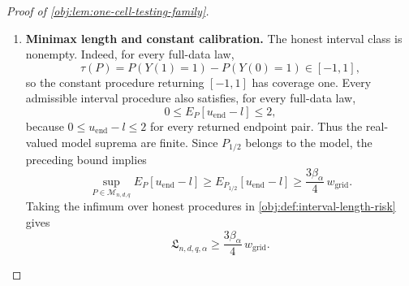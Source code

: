 \begin{proof}[Proof of \cref{obj:lem:one-cell-testing-family}]
\begin{enumerate}
Summing coverage probabilities under the reference output law gives
\[
\int C_{\mathrm{grid}}(l,u_{\mathrm{end}})\,
     \mu_{\mathrm{ref}}(d(l,u_{\mathrm{end}}))
=
\sum_{j=0}^{M}\mu_{\mathrm{ref}}(B_j)
\ge(M+1)(\beta_\alpha-\varepsilon_\alpha).
\]
Integrating the pointwise length bound therefore yields
\[
\int(u_{\mathrm{end}}-l)\,\mu_{\mathrm{ref}}(d(l,u_{\mathrm{end}}))
\ge
\Delta_{\mathrm{grid}}
\left((M+1)\frac{7\beta_\alpha}{8}-1\right).
\]
The choice of \(M\) gives \(M\beta_\alpha\ge8\), and
\[
(M+1)\frac{7\beta_\alpha}{8}-1
-\frac{3\beta_\alpha M}{4}
=
\frac{M\beta_\alpha}{8}
+\frac{7\beta_\alpha}{8}-1
\ge0.
\]
Since \(M\Delta_{\mathrm{grid}}=w_{\mathrm{grid}}\), we conclude
\[
\int(u_{\mathrm{end}}-l)\,\mu_{\mathrm{ref}}(d(l,u_{\mathrm{end}}))
\ge\frac{3\beta_\alpha}{4}\,w_{\mathrm{grid}}.
\]
The endpoint length is measurable and bounded by two. Integrating first over the sample and then over the kernel therefore equals integration under its output law, giving
\[
E_{P_{1/2}}[u_{\mathrm{end}}-l]
=
\int(u_{\mathrm{end}}-l)\,\mu_{\mathrm{ref}}(d(l,u_{\mathrm{end}}))
\ge\frac{3\beta_\alpha}{4}\,w_{\mathrm{grid}}.
\]
All randomization is included in this expectation.

\item \textbf{Minimax length and constant calibration.}
The honest interval class is nonempty. Indeed, for every full-data law,
\[
\tau(P)=P(Y(1)=1)-P(Y(0)=1)\in[-1,1],
\]
so the constant procedure returning \([-1,1]\) has coverage one. Every admissible interval procedure also satisfies, for every full-data law,
\[
0\le E_P[u_{\mathrm{end}}-l]\le2,
\]
because \(0\le u_{\mathrm{end}}-l\le2\) for every returned endpoint pair. Thus the real-valued model suprema are finite. Since \(P_{1/2}\) belongs to the model, the preceding bound implies
\[
\sup_{P\in\mathcal M_{n,d,q}}E_P[u_{\mathrm{end}}-l]
\ge E_{P_{1/2}}[u_{\mathrm{end}}-l]
\ge\frac{3\beta_\alpha}{4}\,w_{\mathrm{grid}}.
\]
Taking the infimum over honest procedures in
\cref{obj:def:interval-length-risk} gives
\[
\mathfrak L_{n,d,q,\alpha}
\ge\frac{3\beta_\alpha}{4}\,w_{\mathrm{grid}}.
\]


\end{enumerate}
\end{proof}
